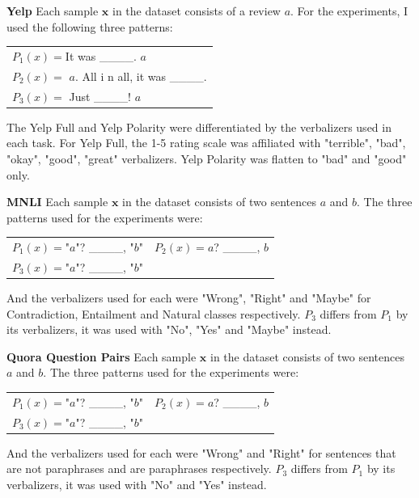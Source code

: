 \documentclass[11pt,a4paper]{article}
\begin{document}
\vspace{8pt}
\noindent \textbf{Yelp} \quad
Each sample $\textbf{x}$ in the dataset consists of a review $a$.
For the experiments, I used the following three patterns:
\begin{table}[H]
	\renewcommand{\arraystretch}{1.5}
	\begin{tabularx}{\textwidth}{l}
		$P_1(x)=$It was \_\_\_\_. $a$ \\
		$P_2(x)=$ $a$. All i n all, it was \_\_\_\_. \\
		$P_3(x)=$ Just \_\_\_\_! $a$  \\
	\end{tabularx}
\end{table}
The Yelp Full and Yelp Polarity were differentiated by the verbalizers used in each task.
For Yelp Full, the 1-5 rating scale was affiliated with "terrible", "bad", "okay", "good", "great" verbalizers.
Yelp Polarity was flatten to "bad" and "good" only.

\vspace{8pt}
\noindent \textbf{MNLI} \quad
Each sample $\textbf{x}$ in the dataset consists of two sentences $a$ and $b$.
The three patterns used for the experiments were:
\begin{table}[H]
	\renewcommand{\arraystretch}{1.5}
	\begin{tabularx}{\textwidth}{cc}
		$P_1(x)=$"$a$"? \_\_\_\_, "$b$" & $P_2(x)=$$a$? \_\_\_\_, $b$ \\
		$P_3(x)=$"$a$"? \_\_\_\_, "$b$" & \\
	\end{tabularx}
\end{table}
And the verbalizers used for each were "Wrong", "Right" and "Maybe" for Contradiction, Entailment and Natural classes respectively.
$P_3$ differs from $P_1$ by its verbalizers, it was used with "No", "Yes" and "Maybe" instead.

\vspace{8pt}
\noindent \textbf{Quora Question Pairs} \quad
Each sample $\textbf{x}$ in the dataset consists of two sentences $a$ and $b$.
The three patterns used for the experiments were:
\begin{table}[H]
	\renewcommand{\arraystretch}{1.5}
	\begin{tabularx}{\textwidth}{cc}
		$P_1(x)=$"$a$"? \_\_\_\_, "$b$" & $P_2(x)=$$a$? \_\_\_\_, $b$ \\ 
		$P_3(x)=$"$a$"? \_\_\_\_, "$b$" & \\
	\end{tabularx}
\end{table}
And the verbalizers used for each were "Wrong" and "Right" for sentences that are not paraphrases and are paraphrases respectively.
$P_3$ differs from $P_1$ by its verbalizers, it was used with "No" and "Yes" instead.
\end{document}
